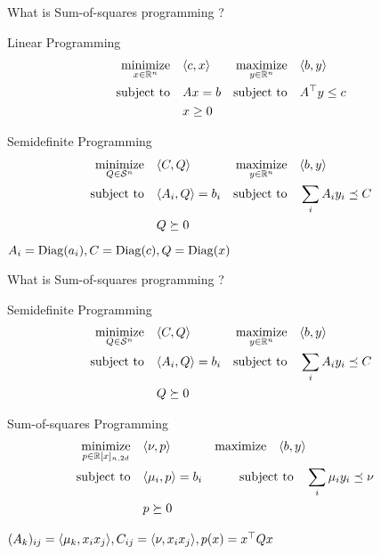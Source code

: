 \documentclass{beamer}
\begin{document}
  \begin{frame}{What is Sum-of-squares programming ?}
    \begin{block}{Linear Programming}
      \vspace{-1em}
      \begin{align*}
        \operatorname*{minimize}_{x \in \mathbb{R}^n}\quad & \langle c, x \rangle & \operatorname*{maximize}_{y \in \mathbb{R}^n} \quad & \langle b, y \rangle\\
        \operatorname*{\operatorname*{\text{subject to}}\quad} & Ax = b & \operatorname*{\operatorname*{\text{subject to}}\quad} & A^\top y \leq c\\
        & x \geq 0
      \end{align*}
    \end{block}
    \vspace{-2em}
    \begin{block}{Semidefinite Programming}
      \vspace{-1em}
      \begin{align*}
        \operatorname*{minimize}_{Q \in \mathcal{S}^n} \quad & \langle C, Q \rangle & \operatorname*{maximize}_{y \in \mathbb{R}^n} \quad & \langle b, y \rangle\\
        \operatorname*{\operatorname*{\text{subject to}}\quad} & \langle A_i, Q \rangle = b_i & \operatorname*{\operatorname*{\text{subject to}}\quad} & \sum_i A_i y_i \preceq C\\
          & Q \succeq 0
      \end{align*}
      $A_i = \operatorname{Diag}(a_i), C = \operatorname{Diag}(c), Q = \operatorname{Diag}(x)$
    \end{block}
  \end{frame}
  \begin{frame}{What is Sum-of-squares programming ?}
    \begin{block}{Semidefinite Programming}
      \vspace{-1em}
      \begin{align*}
        \operatorname*{minimize}_{Q \in \mathcal{S}^n} \quad & \langle C, Q \rangle & \operatorname*{maximize}_{y \in \mathbb{R}^n} \quad & \langle b, y \rangle\\
        \operatorname*{\operatorname*{\text{subject to}}\quad} & \langle A_i, Q \rangle = b_i & \operatorname*{\operatorname*{\text{subject to}}\quad} & \sum_i A_i y_i \preceq C\\
          & Q \succeq 0
      \end{align*}
    \end{block}
    \vspace{-2em}
    \begin{block}{Sum-of-squares Programming}
      \vspace{-1em}
      \begin{align*}
        \operatorname*{minimize}_{p \in \mathbb{R}[x]_{n, 2d}}\quad & \langle \nu, p \rangle & \operatorname*{maximize}\quad \langle b, y \rangle\\
        \operatorname*{\operatorname*{\text{subject to}}\quad} & \langle \mu_i, p \rangle = b_i & \operatorname*{\operatorname*{\text{subject to}}\quad} & \sum_i \mu_i y_i \preceq \nu\\
        & p \succeq 0
      \end{align*}
    \end{block}
    \vspace{-1em}
    $(A_k)_{ij} = \langle \mu_k, x_ix_j \rangle, C_{ij} = \langle \nu, x_ix_j \rangle, p(x) = x^\top Q x$
  \end{frame}
\end{document}
